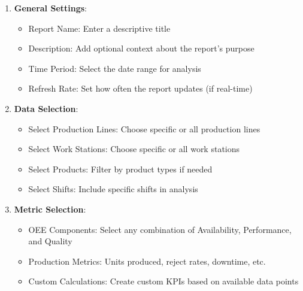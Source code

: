 \documentclass[12pt,a4paper]{report}
\begin{document}
\begin{enumerate}
    \item \textbf{General Settings}:
    \begin{itemize}
        \item Report Name: Enter a descriptive title
        \item Description: Add optional context about the report's purpose
        \item Time Period: Select the date range for analysis
        \item Refresh Rate: Set how often the report updates (if real-time)
    \end{itemize}
    
    \item \textbf{Data Selection}:
    \begin{itemize}
        \item Select Production Lines: Choose specific or all production lines
        \item Select Work Stations: Choose specific or all work stations
        \item Select Products: Filter by product types if needed
        \item Select Shifts: Include specific shifts in analysis
    \end{itemize}
    
    \item \textbf{Metric Selection}:
    \begin{itemize}
        \item OEE Components: Select any combination of Availability, Performance, and Quality
        \item Production Metrics: Units produced, reject rates, downtime, etc.
        \item Custom Calculations: Create custom KPIs based on available data points
    \end{itemize}
\end{enumerate}
\end{document}
